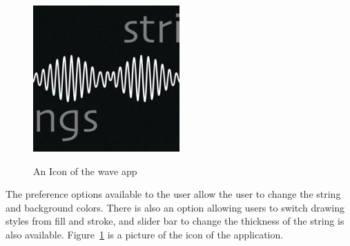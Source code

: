 \documentclass{article}
\begin{document}
  \begin{figure}[h]
 	\caption{An Icon of the wave app}
 	\centering
 	\includegraphics[width=0.5\textwidth]{icon} \label{icon}
 \end{figure}
 

 
 The preference options available to the user allow the user to change the string and background colors. There is also an option allowing users to switch drawing styles from fill and stroke, and slider bar to change the thickness of the string is also available. Figure~\ref{icon} is a picture of the icon of the application.
 
  
 
 
\end{document}
